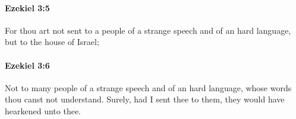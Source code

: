 		\paragraph{Ezekiel 3:5} %
			\label{EZEKIEL-3-5}

			For thou art not sent to a people of a strange speech and of an hard language, but to the house of Israel;


		\paragraph{Ezekiel 3:6} %
			\label{EZEKIEL-3-6}

			Not to many people of a strange speech and of an hard language, whose words thou canst not understand. Surely, had I sent thee to them, they would have hearkened unto thee.


